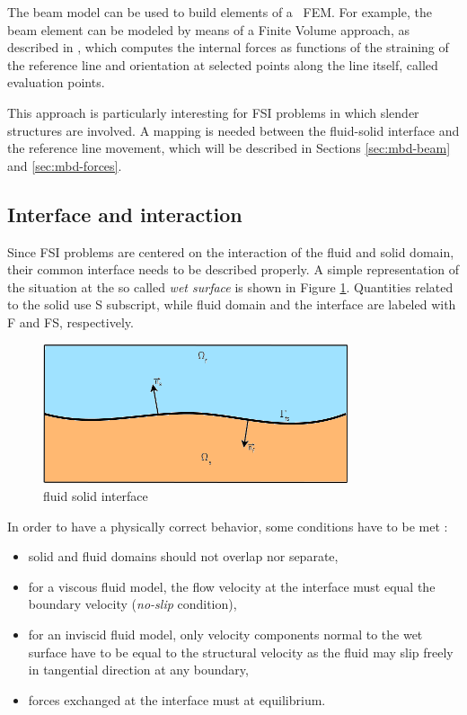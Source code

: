 The beam model can be used to build elements of a ~\ac{FEM}. For example, the beam element can be modeled by means of a Finite Volume approach, as described in \cite{ghiringhelli2000multibody}, which computes the internal forces as functions of the straining of the reference line and orientation at selected points along the line itself, called evaluation points.

This approach is particularly interesting for FSI problems in which slender structures are involved. A mapping is needed between the fluid-solid interface and the reference line movement, which will be described in Sections \ref{sec:mbd-beam} and \ref{sec:mbd-forces}.


\subsection{Interface and interaction}
\label{sec:interface}

Since FSI problems are centered on the interaction of the fluid and solid domain, their common interface needs to be described properly. A simple representation of the situation at the so called \textit{wet surface} is shown in Figure \ref{fig:interface}. Quantities related to the solid use S subscript, while fluid domain and the interface are labeled with F and FS, respectively. 

\begin{figure}[htbp!]
	\centering
	\includegraphics[width=0.8\textwidth]{images/interface}
	\caption{fluid solid interface}
	\label{fig:interface}
\end{figure}

In order to have a physically correct behavior, some conditions have to be met \cite{hou2012numerical}:

\begin{itemize}
	\item solid and fluid domains should not overlap nor separate,
	\item for a viscous fluid model, the flow velocity at the interface must equal the boundary velocity (\textit{no-slip} condition),
	\item for an inviscid fluid model, only velocity components normal to the wet surface have to be equal to the structural 	velocity as the fluid may slip freely in tangential direction at any boundary,
	\item forces exchanged at the interface must at equilibrium.
\end{itemize}

